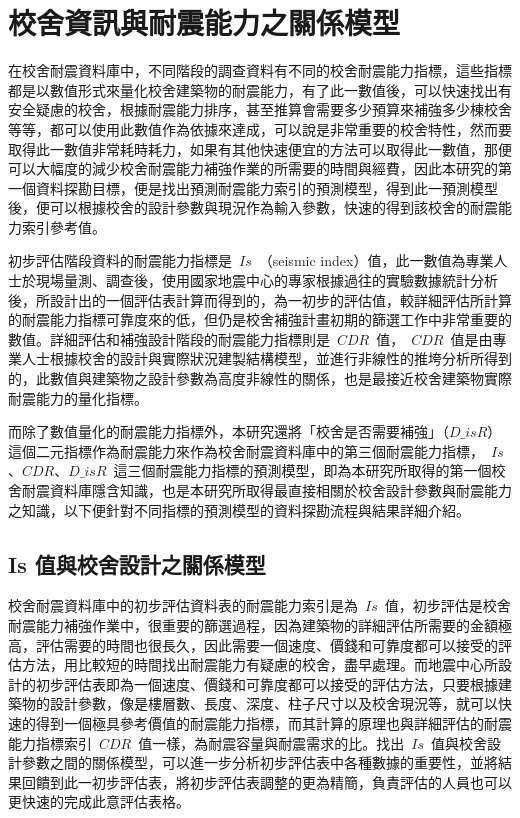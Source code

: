\renewcommand\thetable{\arabic{chapter}-\arabic{table}}
\chapter{校舍資訊與耐震能力之關係模型}

在校舍耐震資料庫中，不同階段的調查資料有不同的校舍耐震能力指標，這些指標都是以數值形式來量化校舍建築物的耐震能力，有了此一數值後，可以快速找出有安全疑慮的校舍，根據耐震能力排序，甚至推算會需要多少預算來補強多少棟校舍等等，都可以使用此數值作為依據來達成，可以說是非常重要的校舍特性，然而要取得此一數值非常耗時耗力，如果有其他快速便宜的方法可以取得此一數值，那便可以大幅度的減少校舍耐震能力補強作業的所需要的時間與經費，因此本研究的第一個資料探勘目標，便是找出預測耐震能力索引的預測模型，得到此一預測模型後，便可以根據校舍的設計參數與現況作為輸入參數，快速的得到該校舍的耐震能力索引參考值。

初步評估階段資料的耐震能力指標是~$Is$~（seismic index）值，此一數值為專業人士於現場量測、調查後，使用國家地震中心的專家根據過往的實驗數據統計分析後，所設計出的一個評估表計算而得到的，為一初步的評估值，較詳細評估所計算的耐震能力指標可靠度來的低，但仍是校舍補強計畫初期的篩選工作中非常重要的數值。詳細評估和補強設計階段的耐震能力指標則是~$CDR$~值，~$CDR$~值是由專業人士根據校舍的設計與實際狀況建製結構模型，並進行非線性的推垮分析所得到的，此數值與建築物之設計參數為高度非線性的關係，也是最接近校舍建築物實際耐震能力的量化指標。

而除了數值量化的耐震能力指標外，本研究還將「校舍是否需要補強」（$D\_isR$）這個二元指標作為耐震能力來作為校舍耐震資料庫中的第三個耐震能力指標，~$Is$、$CDR$、$D\_isR$~這三個耐震能力指標的預測模型，即為本研究所取得的第一個校舍耐震資料庫隱含知識，也是本研究所取得最直接相關於校舍設計參數與耐震能力之知識，以下便針對不同指標的預測模型的資料探勘流程與結果詳細介紹。

\section{Is 值與校舍設計之關係模型}

校舍耐震資料庫中的初步評估資料表的耐震能力索引是為~$Is$~值，初步評估是校舍耐震能力補強作業中，很重要的篩選過程，因為建築物的詳細評估所需要的金額極高，評估需要的時間也很長久，因此需要一個速度、價錢和可靠度都可以接受的評估方法，用比較短的時間找出耐震能力有疑慮的校舍，盡早處理。而地震中心所設計的初步評估表即為一個速度、價錢和可靠度都可以接受的評估方法，只要根據建築物的設計參數，像是樓層數、長度、深度、柱子尺寸以及校舍現況等，就可以快速的得到一個極具參考價值的耐震能力指標，而其計算的原理也與詳細評估的耐震能力指標索引~$CDR$~值一樣，為耐震容量與耐震需求的比。找出~$Is$~值與校舍設計參數之間的關係模型，可以進一步分析初步評估表中各種數據的重要性，並將結果回饋到此一初步評估表，將初步評估表調整的更為精簡，負責評估的人員也可以更快速的完成此意評估表格。

